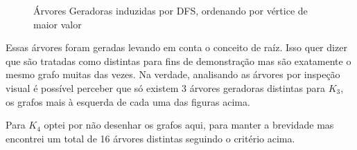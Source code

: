 \documentclass{article}
\begin{document}
\begin{figure}[H]
    \centering
    \hfill
    \begin{subfigure}{.30\textwidth}
    \end{subfigure}
    \hfill
    \begin{subfigure}{.30\textwidth}
    \end{subfigure}
    \hfill
    \begin{subfigure}{.30\textwidth}
    \end{subfigure}
    \caption{Árvores Geradoras induzidas por DFS, ordenando por vértice de maior valor}
\end{figure}

Essas árvores foram geradas levando em conta o conceito de raíz. Isso quer dizer que são tratadas como distintas para fins de demonstração mas são exatamente o mesmo grafo muitas das vezes. Na verdade, analisando as árvores por inspeção visual é possível perceber que só existem 3 árvores geradoras distintas para ${K_3}$, os grafos mais à esquerda de cada uma das figuras acima.

Para ${K_4}$ optei por não desenhar os grafos aqui, para manter a brevidade mas encontrei um total de 16 árvores distintas seguindo o critério acima.
\end{document}
